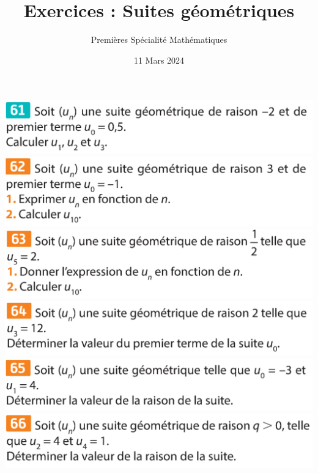 \documentclass{article}
\title{Exercices : Suites géométriques}
\author{Premières Spécialité Mathématiques}
\date{11 Mars 2024}
\begin{document}
\maketitle

\begin{center}
\includegraphics[width=\textwidth]{Exercice_1.png}
\includegraphics[width=\textwidth]{Exercice_2.png}
\includegraphics[width=\textwidth]{Exercice_3.png}
\includegraphics[width=\textwidth]{Exercice_4.png}
\includegraphics[width=\textwidth]{Exercice_5.png}
\includegraphics[width=\textwidth]{Exercice_6.png}
\end{center}
\end{document}
